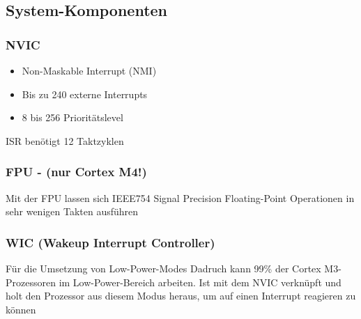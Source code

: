 \subsection{System-Komponenten}
\begin{multicols}{2}
\begin{minipage}{\linewidth}
    \subsubsection{NVIC}
    \begin{itemize}
    \item Non-Maskable Interrupt (NMI)
    \item Bis zu 240 externe Interrupts
    \item 8 bis 256 Prioritätslevel
    \end{itemize}
    \rightarrow ISR benötigt 12 Taktzyklen\\
\end{minipage}
\begin{minipage}{\linewidth}
    \subsubsection{FPU - (nur Cortex M4!)}
    Mit der FPU lassen sich IEEE754 Signal Precision Floating-Point Operationen in sehr wenigen Takten ausführen\\
\end{minipage}
\begin{minipage}{\linewidth}
    \subsubsection{WIC (Wakeup Interrupt Controller)}
    Für die Umsetzung von Low-Power-Modes\newline
    Dadruch kann 99\% der Cortex M3-Prozessoren im Low-Power-Bereich arbeiten.
    \newline
    Ist mit dem NVIC verknüpft und holt den Prozessor aus diesem Modus heraus, um auf einen Interrupt reagieren zu können\\
\end{minipage}
\begin{minipage}{\linewidth}

\end{minipage}
\end{multicols}
